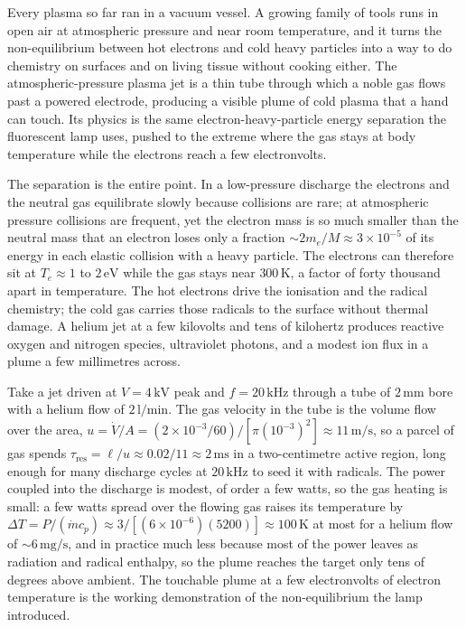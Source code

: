 Every plasma so far ran in a vacuum vessel. A growing family of tools runs in
open air at atmospheric pressure and near room temperature, and it turns the
non-equilibrium between hot electrons and cold heavy particles into a way to do
chemistry on surfaces and on living tissue without cooking either. The
atmospheric-pressure plasma jet is a thin tube through which a noble gas flows
past a powered electrode, producing a visible plume of cold plasma that a hand
can touch. Its physics is the same electron-heavy-particle energy separation the
fluorescent lamp uses, pushed to the extreme where the gas stays at body
temperature while the electrons reach a few electronvolts.

The separation is the entire point. In a low-pressure discharge the electrons
and the neutral gas equilibrate slowly because collisions are rare; at
atmospheric pressure collisions are frequent, yet the electron mass is so much
smaller than the neutral mass that an electron loses only a fraction $\sim
2m_e/M \approx 3\times 10^{-5}$ of its energy in each elastic collision with a
heavy particle. The electrons can therefore sit at $T_e \approx 1$ to $2\,\si{
\electronvolt}$ while the gas stays near $300\,\si{\kelvin}$, a factor of forty
thousand apart in temperature. The hot electrons drive the ionisation and the
radical chemistry; the cold gas carries those radicals to the surface without
thermal damage. A helium jet at a few kilovolts and tens of kilohertz produces
reactive oxygen and nitrogen species, ultraviolet photons, and a modest ion flux
in a plume a few millimetres across.

Take a jet driven at $V = 4\,\si{\kilo\volt}$ peak and $f = 20\,\si{\kilo\hertz}$
through a tube of $2\,\si{\milli\meter}$ bore with a helium flow of $2\,\si{\litre
\per\minute}$. The gas velocity in the tube is the volume flow over the area,
$u = \dot{V}/A = (2\times 10^{-3}/60)/[\pi(10^{-3})^{2}] \approx 11\,\si{\meter
\per\second}$, so a parcel of gas spends $\tau_{\mathrm{res}} = \ell/u \approx
0.02/11 \approx 2\,\si{\milli\second}$ in a two-centimetre active region, long
enough for many discharge cycles at $20\,\si{\kilo\hertz}$ to seed it with
radicals. The power coupled into the discharge is modest, of order a few watts,
so the gas heating is small: a few watts spread over the flowing gas raises its
temperature by $\Delta T = P/(\dot{m}c_p) \approx 3/[(6\times 10^{-6})(5200)]
\approx 100\,\si{\kelvin}$ at most for a helium flow of $\sim 6\,\si{\milli\gram
\per\second}$, and in practice much less because most of the power leaves as
radiation and radical enthalpy, so the plume reaches the target only tens of
degrees above ambient. The touchable plume at a few electronvolts of electron
temperature is the working demonstration of the non-equilibrium the lamp
introduced.

